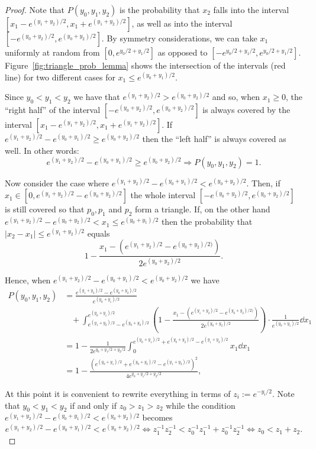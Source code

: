 \begin{proof}
Note that $P(y_0,y_1,y_2)$ is the probability that $x_2$ falls into the interval $[x_1-e^{(y_1+y_2)/2},x_1+e^{(y_1+y_2)/2}]$, as well as into the interval $[-e^{(y_0+y_2)/2},e^{(y_0+y_2)/2}]$. By symmetry considerations, we can take $x_1$ uniformly at random from $[0,e^{y_0/2+y_1/2}]$ as opposed to $[-e^{y_0/2+y_1/2}, e^{y_0/2+y_1/2}]$. Figure~\ref{fig:triangle_prob_lemma} shows the intersection of the intervals (red line) for two different cases for $x_1 \le e^{(y_0 + y_1)/2}$. 

Since $y_0 < y_1 < y_2$ we have that $e^{(y_1+y_2)/2} > e^{(y_0+y_2)/2}$ and so, when $x_1 \geq 0$, the ``right half'' of the 
interval $[-e^{(y_0+y_2)/2}, e^{(y_0+y_2)/2}]$ is always covered by the interval $[x_1-e^{(y_1+y_2)/2}, x_1+e^{(y_1+y_2)/2}]$.
If $e^{(y_1+y_2)/2} - e^{(y_0+y_1)/2} \geq e^{(y_0+y_2)/2}$ then the ``left half'' is always covered as well.
In other words:
\[
	e^{(y_1+y_2)/2} - e^{(y_0+y_1)/2} \geq e^{(y_0+y_2)/2} \Rightarrow P(y_0,y_1,y_2) = 1.
\]

Now consider the case where $e^{(y_1+y_2)/2} - e^{(y_0+y_1)/2} < e^{(y_0+y_2)/2}$. 
Then, if $x_1 \in [0, e^{(y_1+y_2)/2} - e^{(y_0+y_2)/2}]$ the whole interval $[-e^{(y_0+y_2)/2}, e^{(y_0+y_2)/2}]$ is still covered 
so that $p_0, p_1$ and $p_2$ form a triangle. If, on the other hand $e^{(y_1+y_2)/2} - e^{(y_0+y_2)/2} < x_1 \leq e^{(y_0+y_1)/2}$ then
the probability that $|x_2-x_1| \leq e^{(y_1+y_2)/2}$ equals
\[ 
	1 - \frac{x_1 - (e^{(y_1+y_2)/2} - e^{(y_0+y_2)/2)}) }{ 2e^{(y_0+y_2)/2} }. 
\]

Hence, when $e^{(y_1+y_2)/2} - e^{(y_0+y_1)/2} < e^{(y_0+y_2)/2}$ we have
\begin{align*}
	P(y_0,y_1,y_2) &= \frac{e^{(y_1+y_2)/2} - e^{(y_0+y_2)/2} }{ e^{(y_0+y_1)/2} }  \\
	&\hspace{10pt}+ \int_{ e^{(y_1+y_2)/2} - e^{(y_0+y_2)/2} }^{ e^{(y_0+y_1)/2} } 
	    \left(1 - \frac{x_1 - (e^{(y_1+y_2)/2} - e^{(y_0+y_2)/2)}) }{ 2e^{(y_0+y_2)/2} }\right)
	    \cdot \frac{1}{e^{(y_0+y_1)/2}} \dd x_1 \\
	&= 1 - \frac{1}{2e^{y_0+y_1/2+y_2/2} } \int_0^{ e^{(y_0+y_1)/2}+e^{(y_0+y_2)/2}-e^{(y_1+y_2)/2} } x_1 \dd x_1 \\
	&= 1 - \frac{ \left( e^{(y_0+y_1)/2}+e^{(y_0+y_2)/2}-e^{(y_1+y_2)/2} \right)^2 }{ 4 e^{y_0+y_1/2+y_2/2} },
\end{align*}

At this point it is convenient to rewrite everything in terms of $z_i := e^{-y_i/2}$.
Note that $y_0 < y_1 < y_2$ if and only if $z_0 > z_1 > z_2$ while the condition $e^{(y_1+y_2)/2} - e^{(y_0+y_1)/2} < e^{(y_0+y_2)/2}$ becomes
\[ e^{(y_1+y_2)/2} - e^{(y_0+y_1)/2} < e^{(y_0+y_2)/2} \Leftrightarrow 
z_1^{-1} z_2^{-1} < z_0^{-1} z_1^{-1} + z_0^{-1}z_2^{-1} 
\Leftrightarrow
z_0 < z_1+z_2. 
\]


\end{proof}
